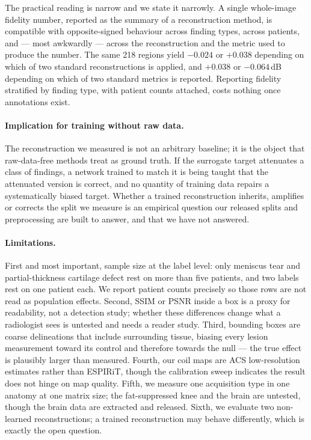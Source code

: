 \documentclass[letterpaper]{article} %
\begin{document}
The practical reading is narrow and we state it narrowly. A single whole-image
fidelity number, reported as the summary of a reconstruction method, is
compatible with opposite-signed behaviour across finding types, across patients,
and --- most awkwardly --- across the reconstruction and the metric used to
produce the number. The same 218 regions yield $-0.024$ or $+0.038$ depending on
which of two standard reconstructions is applied, and $+0.038$ or $-0.064$\,dB
depending on which of two standard metrics is reported. Reporting fidelity
stratified by finding type, with patient counts attached, costs nothing once
annotations exist.

\paragraph{Implication for training without raw data.}
The reconstruction we measured is not an arbitrary baseline; it is the object
that raw-data-free methods treat as ground truth. If the surrogate target
attenuates a class of findings, a network trained to match it is being taught
that the attenuated version is correct, and no quantity of training data repairs
a systematically biased target. Whether a trained reconstruction inherits,
amplifies or corrects the split we measure is an empirical question our released
splits and preprocessing are built to answer, and that we have not answered.

\paragraph{Limitations.}
First and most important, sample size at the label level: only meniscus tear and
partial-thickness cartilage defect rest on more than five patients, and two
labels rest on one patient each. We report patient counts precisely so those
rows are not read as population effects. Second, SSIM or PSNR inside a box is a
proxy for readability, not a detection study; whether these differences change
what a radiologist sees is untested and needs a reader study. Third, bounding
boxes are coarse delineations that include surrounding tissue, biasing every
lesion measurement toward its control and therefore towards the null --- the
true effect is plausibly larger than measured. Fourth, our coil maps are ACS
low-resolution estimates rather than ESPIRiT, though the calibration sweep
indicates the result does not hinge on map quality. Fifth, we measure one
acquisition type in one anatomy at one matrix size; the fat-suppressed knee and
the brain are untested, though the brain data are extracted and released. Sixth,
we evaluate two non-learned reconstructions; a trained reconstruction may behave
differently, which is exactly the open question.
\end{document}
